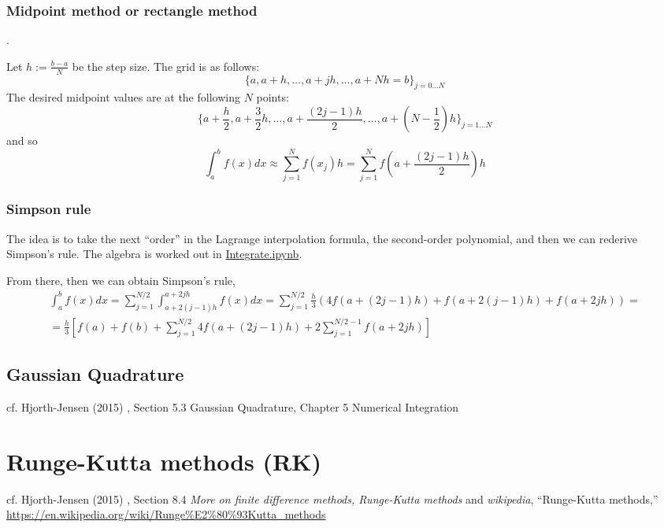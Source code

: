 \documentclass[10pt]{amsart}
\begin{document}
\begin{multicols*}{2}
\subsubsection{Midpoint method or rectangle method}.

Let $h := \frac{b-a}{N}$ be the step size.  The grid is as follows:
\[
\lbrace a , a +h , \dots , a + jh , \dots , a+Nh = b\rbrace_{j=0\dots N}
\]
The desired midpoint values are at the following $N$ points:
\[
\lbrace a + \frac{h}{2} , a + \frac{3}{2} h , \dots , a+\frac{(2j-1 ) h }{2} , \dots , a + \left( N - \frac{1}{2} \right) h \rbrace_{j=1 \dots N}
\]
and so
\begin{equation}
  \int_a^b f(x) dx \approx \sum_{j=1}^N f(x_j) h = \sum_{j=1}^N f\left( a + \frac{(2j-1) h}{2} \right)h 
\end{equation}


\subsubsection{Simpson rule}

The idea is to take the next ``order'' in the Lagrange interpolation formula, the second-order polynomial, and then we can rederive Simpson's rule.  The algebra is worked out in \href{https://github.com/ernestyalumni/CompPhys/blob/master/Cpp/Integrate.ipynb}{Integrate.ipynb}.

From there, then we can obtain Simpson's rule,
\[
\begin{gathered}
  \int_a^b f(x)dx = \sum_{j=1}^{N/2} \int_{a + 2(j-1)h }^{a+2jh} f(x) dx = \sum_{j=1}^{N/2} \frac{h}{3} ( 4 f(a+(2j-1)h ) + f(a+2(j-1)h) + f(a+2jh) ) = \\
  = \frac{h}{3} \left[ f(a) + f(b) + \sum_{j=1}^{N/2} 4f(a+(2j-1) h) + 2\sum_{j=1}^{N/2-1} f(a+2jh) \right]
\end{gathered}
\]

\subsection{Gaussian Quadrature}

cf. Hjorth-Jensen (2015) \cite{Hjor2015}, Section 5.3 Gaussian Quadrature, Chapter 5 Numerical Integration


\section{Runge-Kutta methods (RK) }

cf. Hjorth-Jensen (2015) \cite{Hjor2015}, Section 8.4 \emph{More on finite difference methods, Runge-Kutta methods} and \emph{wikipedia}, ``Runge-Kutta methods,'' \url{https://en.wikipedia.org/wiki/Runge\%E2\%80\%93Kutta_methods}


\end{multicols*}
\end{document}
